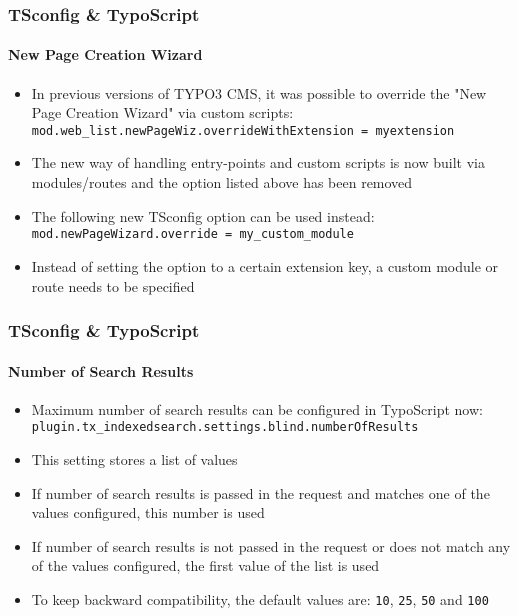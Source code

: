 
\begin{frame}[fragile]
	\frametitle{TSconfig \& TypoScript}
	\framesubtitle{New Page Creation Wizard}

	\begin{itemize}
		\item In previous versions of TYPO3 CMS, it was possible to override the "New Page Creation Wizard"
			via custom scripts:\newline
			\small
				\texttt{mod.web\_list.newPageWiz.overrideWithExtension = myextension}
			\normalsize
		\item The new way of handling entry-points and custom scripts is now built via modules/routes
			and the option listed above has been removed
		\item The following new TSconfig option can be used instead:
			\small
				\texttt{mod.newPageWizard.override = my\_custom\_module}
			\normalsize

		\item Instead of setting the option to a certain extension key, a custom module or
			route needs to be specified

	\end{itemize}

\end{frame}

\begin{frame}[fragile]
	\frametitle{TSconfig \& TypoScript}
	\framesubtitle{Number of Search Results}

	\begin{itemize}
		\item Maximum number of search results can be configured in TypoScript now:\newline
			\texttt{plugin.tx\_indexedsearch.settings.blind.numberOfResults}
		\item This setting stores a list of values
		\item If number of search results is passed in the request and matches one of the values
			configured, this number is used
		\item If number of search results is not passed in the request or does not match any of
			the values configured, the first value of the list is used
		\item To keep backward compatibility, the default values are:\newline
			\texttt{10}, \texttt{25}, \texttt{50} and \texttt{100}
	\end{itemize}

\end{frame}

